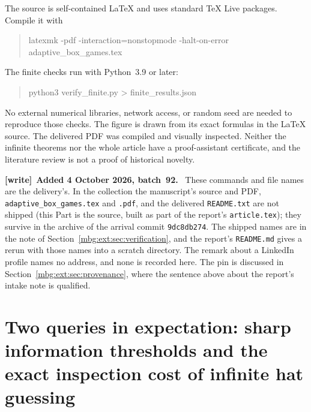 \documentclass[11pt,letterpaper]{article}
\theoremstyle{definition}
\newenvironment{writenote}[1][]{\par\smallskip\begingroup\small
 \noindent\textbf{[write]}\if\relax\detokenize{#1}\relax\else~\textbf{#1.}\fi\ }%
 {\par\endgroup\smallskip}
\begin{document}
The source is self-contained LaTeX and uses standard TeX Live packages. Compile it with
\begin{quote}\small\ttfamily
latexmk -pdf -interaction=nonstopmode -halt-on-error\newline
\hspace*{1em}adaptive\_box\_games.tex
\end{quote}
The finite checks run with Python~3.9 or later:
\begin{quote}\ttfamily
python3 verify\_finite.py > finite\_results.json
\end{quote}
No external numerical libraries, network access, or random seed are needed to reproduce those checks. The figure is drawn from its exact formulas in the LaTeX source. The delivered PDF was compiled and visually inspected. Neither the infinite theorems nor the whole article have a proof-assistant certificate, and the literature review is not a proof of historical novelty.

\begin{writenote}[Added 4 October 2026, batch~92]
These commands and file names are the delivery's. In the collection the manuscript's source and PDF, \texttt{adaptive\_\allowbreak box\_\allowbreak games.tex} and \texttt{.pdf}, and the delivered \texttt{README.txt} are not shipped (this Part is the source, built as part of the report's \texttt{article.tex}); they survive in the archive of the arrival commit \texttt{9dc8db274}. The shipped names are in the note of Section~\ref{mbg:ext:sec:verification}, and the report's \texttt{README.md} gives a rerun with those names into a scratch directory. The remark about a LinkedIn profile names no address, and none is recorded here. The pin is discussed in Section~\ref{mbg:ext:sec:provenance}, where the sentence above about the report's intake note is qualified.
\end{writenote}


\clearpage
{}
\part{Two queries in expectation: sharp information thresholds and the exact inspection cost of infinite hat guessing}
\label{mbg:qry:part}

\setcounter{section}{44}
\renewcommand{\thesection}{\arabic{section}}
\renewcommand{\theHsection}{qry.\arabic{section}}
\makeatletter\gdef\Hy@chapapp{\Hy@chapterstring}\makeatother
{}
\renewcommand{\theHequation}{\theHsection.\arabic{equation}}
\end{document}
